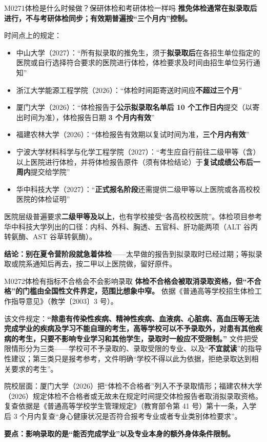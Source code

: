 \begin{qa}{M0271}{体检是什么时候做？保研体检和考研体检一样吗}
\textbf{推免体检通常在拟录取后进行，不与考研体检同步；有效期普遍按“三个月内”控制。}

时间点上的规定：

\begin{itemize}
  \item 中山大学（2027）：“所有拟录取的推免生，须于\textbf{拟录取后}在各招生单位指定的医院或自行选择符合要求的医院进行体检，体检要求及时间由招生单位另行通知”
  \item 浙江大学能源工程学院（2026）：“体检时间距寄送时间应\textbf{不超过三个月}”
  \item 厦门大学（2026）：“体检报告于\textbf{公示拟录取名单后 10 个工作日内}提交（以寄出时间为准），体检报告日期 \textbf{3 个月内有效}”
  \item 福建农林大学（2026）：“体检报告有效期以复试时间为准，\textbf{三个月内有效}”
  \item 宁波大学材料科学与化学工程学院（2027）：“考生应自行前往二级甲等（含）以上医院进行体检，并将体检报告原件（须有体检结论）于\textbf{复试成绩公布后一周内}提交给学院”
  \item 华中科技大学（2027）：“\textbf{正式报名阶段}还需提供二级甲等以上医院或各高校校医院的体检证明”
\end{itemize}

医院层级普遍要求\textbf{二级甲等及以上}，也有学校接受“各高校校医院”。体检项目参考华中科技大学列出的口径：内科、外科、胸透、五官科、肝功能两项（ALT 谷丙转氨酶、AST 谷草转氨酶）。

\textbf{结论：别在夏令营阶段就急着体检}——太早做的报告到拟录取时已经过期；等拟录取或院系通知后再去，按二甲以上医院做，留好原件。
\end{qa}

\begin{qa}{M0272}{体检有指标不合格会不会影响录取}
\textbf{体检不合格会被取消录取资格，但“不合格”的门槛由全国性文件界定，范围比想象中窄。} 依据《普通高等学校招生体检工作指导意见》（教学〔2003〕3 号）。

该文件规定：\textbf{“除患有传染性疾病、精神性疾病、血液病、心脏病、高血压等无法完成学业的疾病及学习不能自理的考生，高等学校可以不予录取外，对患有其他疾病的考生，只要不影响专业学习和其他学生，录取时一般应不受限制。”} 文件把受限情形分为三类——学校可不予录取的、录取受限的专业、以及“\textbf{不宜就读}”的指导性建议；第三类只是报考参考，文件明确“学校不得以此为依据，拒绝录取达到相关要求的考生”。

院校层面：厦门大学（2026）把“体检不合格者”列入不予录取情形；福建农林大学（2026）规定体检不合格者或无故未在规定时间提交体检报告者取消拟录取资格。复查依据是《普通高等学校学生管理规定》（教育部令第 41 号）第十一条，入学后 3 个月内复查“身心健康状况是否符合报考专业或者专业类别体检要求”。

\textbf{要点：影响录取的是“能否完成学业”以及专业本身的额外身体条件限制。}
\end{qa}

